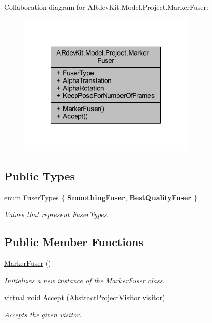 Collaboration diagram for A\-Rdev\-Kit.\-Model.\-Project.\-Marker\-Fuser\-:
\nopagebreak
\begin{figure}[H]
\begin{center}
\leavevmode
\includegraphics[width=240pt]{class_a_rdev_kit_1_1_model_1_1_project_1_1_marker_fuser__coll__graph}
\end{center}
\end{figure}
\subsection*{Public Types}
\begin{DoxyCompactItemize}
\item 
enum \hyperlink{class_a_rdev_kit_1_1_model_1_1_project_1_1_marker_fuser_a27640545baec2d64d0cc55af7818a6eb}{Fuser\-Types} \{ {\bfseries Smoothing\-Fuser}, 
{\bfseries Best\-Quality\-Fuser}
 \}
\begin{DoxyCompactList}\small\item\em Values that represent Fuser\-Types. \end{DoxyCompactList}\end{DoxyCompactItemize}
\subsection*{Public Member Functions}
\begin{DoxyCompactItemize}
\item 
\hyperlink{class_a_rdev_kit_1_1_model_1_1_project_1_1_marker_fuser_abaac50c9d575b535bc25c4ff98f7992d}{Marker\-Fuser} ()
\begin{DoxyCompactList}\small\item\em Initializes a new instance of the \hyperlink{class_a_rdev_kit_1_1_model_1_1_project_1_1_marker_fuser}{Marker\-Fuser} class. \end{DoxyCompactList}\item 
virtual void \hyperlink{class_a_rdev_kit_1_1_model_1_1_project_1_1_marker_fuser_af578e1415404a6b16c67607e3e5ea059}{Accept} (\hyperlink{class_a_rdev_kit_1_1_controller_1_1_project_controller_1_1_abstract_project_visitor}{Abstract\-Project\-Visitor} visitor)
\begin{DoxyCompactList}\small\item\em Accepts the given visitor. \end{DoxyCompactList}\end{DoxyCompactItemize}
